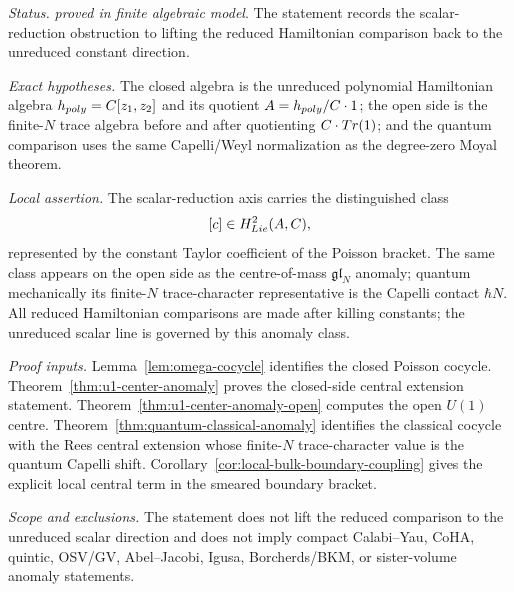 \begin{stmt}\label{thm:lane-u1-anomaly}
  \emph{Status.} \emph{proved in finite algebraic model}.  The statement
  records the scalar-reduction obstruction to lifting the reduced
  Hamiltonian comparison back to the unreduced constant direction.

  \emph{Exact hypotheses.} The closed algebra is the unreduced polynomial
  Hamiltonian algebra \(h_{poly}=C[z_1,z_2]\) and
  its quotient \(A=h_{poly}/C\cdot1\); the open
  side is the finite-\(N\) trace algebra before and after quotienting
  \(C\cdot Tr(1)\); and the quantum comparison uses the
  same Capelli/Weyl normalization as the degree-zero Moyal theorem.

  \emph{Local assertion.} The scalar-reduction axis carries the
  distinguished class
  \[
    [c]\in H^2_{Lie}(A,C),
  \]
  represented by the constant Taylor coefficient of the Poisson
  bracket.  The same class appears on the open side as the
  centre-of-mass \(\mathfrak{gl}_N\) anomaly; quantum mechanically its
  finite-\(N\) trace-character representative is the Capelli contact
  \(\hbar N\).  All reduced Hamiltonian comparisons are made after
  killing constants; the unreduced scalar line is governed by this
  anomaly class.

  \emph{Proof inputs.}
  Lemma~\ref{lem:omega-cocycle} identifies the closed Poisson cocycle.
  Theorem~\ref{thm:u1-center-anomaly} proves the closed-side central
  extension statement.  Theorem~\ref{thm:u1-center-anomaly-open}
  computes the open \(U(1)\) centre.  Theorem~\ref{thm:quantum-classical-anomaly}
  identifies the classical cocycle with the Rees central extension whose
  finite-\(N\) trace-character value is the quantum Capelli shift.
  Corollary~\ref{cor:local-bulk-boundary-coupling} gives the explicit
  local central term in the smeared boundary bracket.

  \emph{Scope and exclusions.} The statement does not lift the reduced comparison to the
  unreduced scalar direction and does not imply compact Calabi--Yau,
  CoHA, quintic, OSV/GV, Abel--Jacobi, Igusa, Borcherds/BKM, or
  sister-volume anomaly statements.
\end{stmt}
